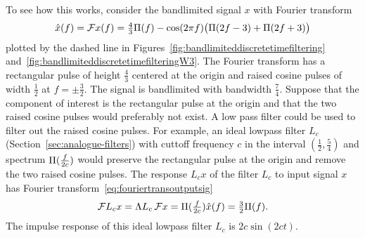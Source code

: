 To see how this works, consider the bandlimited signal $x$ with Fourier transform
\begin{equation}\label{eq:examplebandlimtedsignalforfiltering}
\hat{x}(f) = {\mathcal F} x(f) = \tfrac{4}{3}\Pi(f) - \cos(2\pi f) \big( \Pi(2f - 3) + \Pi(2f + 3) \big)
\end{equation}
plotted by the dashed line in Figures~\ref{fig:bandlimiteddiscretetimefiltering} and~\ref{fig:bandlimiteddiscretetimefilteringW3}.  The Fourier transform has a rectangular pulse of height $\tfrac{4}{3}$ centered at the origin and raised cosine pulses of width $\tfrac{1}{2}$ at $f = \pm \tfrac{3}{2}$.  The signal is bandlimited with bandwidth $\tfrac{7}{4}$.  Suppose that the component of interest is the rectangular pulse at the origin and that the two raised cosine pulses would preferably not exist.  A low pass filter could be used to filter out the raised cosine pulses.  For example, an ideal lowpass filter $L_c$ (Section~\ref{sec:analogue-filters}) with cuttoff frequency $c$ in the interval $(\tfrac{1}{2}, \tfrac{5}{4})$ and spectrum $\Pi(\tfrac{f}{2c})$ would preserve the rectangular pulse at the origin and remove the two raised cosine pulses.  The response $L_c x$ of the filter $L_c$ to input signal $x$ has Fourier transform~\eqref{eq:fouriertransoutputsig}
\[
{\mathcal F} L_c x = \Lambda L_c \, {\mathcal F} x = \Pi(\tfrac{f}{2c}) \hat{x}(f) = \tfrac{3}{2} \Pi(f).
\]
The impulse response of this ideal lowpass filter $L_c$ is $2c\sin(2ct)$.

